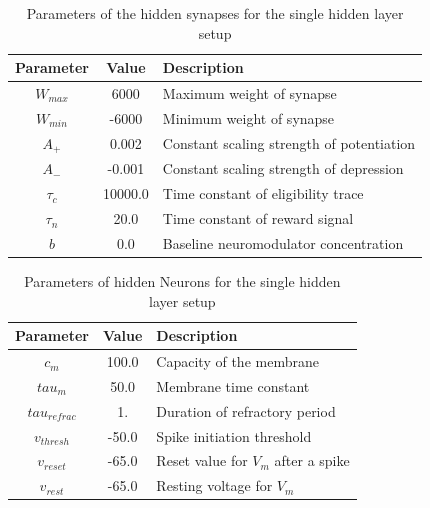 



\begin{table}[htpb]
  \centering
  \caption[Parameters Single Hidden Layer]{Parameters of the hidden synapses for the single hidden layer setup} \label{tab:M1SynH}
  \begin{tabular}{|c| c |l|}
      \toprule
      Parameter  & Value & Description \\
      \midrule
      $W_{max}$ & 6000   & Maximum weight of synapse\\   
      $W_{min}$ & -6000  & Minimum weight of synapse\\   
      $A_{+}$   & 0.002    & Constant scaling strength of potentiation\\   
      $A_{-}$   & -0.001   & Constant scaling strength of depression \\   
      $\tau_c$  & 10000.0   & Time constant of eligibility trace \\  
      $\tau_n$  & 20.0   & Time constant of reward signal  \\   
      $b$       & 0.0    & Baseline neuromodulator concentration \\    
      \bottomrule
  \end{tabular}
\end{table}
  
  \begin{table}[htpb]
  \centering
  \caption[Parameters 2.Setup]{Parameters of hidden Neurons for the single hidden layer setup} \label{tab:M1hiddenN}
    \begin{tabular}{|c| c |l|}
      \toprule
      Parameter & Value & Description \\
      \midrule
      $c_m$   & 100.0  & Capacity of the membrane \\
      $tau_{m}$    & 50.0  & Membrane time constant \\
      $tau_{refrac}$   & 1.  & Duration of refractory period\\
      $v_{thresh}$   & -50.0  & Spike initiation threshold \\
      $v_{reset}$    & -65.0  &  Reset value for $V_m$ after a spike \\
      $v_{rest}$ & -65.0 & Resting voltage for $V_m$ \\
      \bottomrule
    \end{tabular}
  \end{table}

